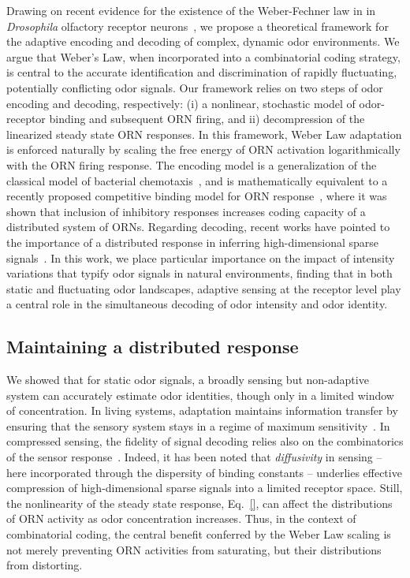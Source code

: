 Drawing on recent evidence for the existence of the Weber-Fechner law in in \textit{Drosophila} olfactory receptor neurons~\cite{cafaro_WL, cao_WL,  srinivas_elife}, we propose a theoretical framework for the adaptive encoding and decoding of complex, dynamic odor environments. We argue that Weber's Law, when incorporated into a combinatorial coding strategy, is central to the accurate identification and discrimination of rapidly fluctuating, potentially conflicting odor signals. Our framework relies on two steps of odor encoding and decoding, respectively: (i) a nonlinear, stochastic model of odor-receptor binding and subsequent ORN firing, and ii) decompression of the linearized steady state ORN responses. In this framework, Weber Law adaptation is enforced naturally by scaling the free energy of ORN activation logarithmically with the ORN firing response. The encoding model is a generalization of the classical model of bacterial chemotaxis~\cite{tu_shimizu_berg}, and is mathematically equivalent to a recently proposed competitive binding model for ORN response~\cite{Cao_Tu_WL}, where it was shown that inclusion of inhibitory responses increases coding capacity of a distributed system of ORNs. Regarding decoding, recent works have pointed to the importance of a distributed response in inferring high-dimensional sparse signals~\cite{vijay_1, vijay_2, sharpee_zhang}. In this work, we place particular importance on the impact of intensity variations that typify odor signals in natural environments, finding that in both static and fluctuating odor landscapes, adaptive sensing at the receptor level play a central role in the simultaneous decoding of odor intensity and odor identity. 


\subsection*{Maintaining a distributed response}

We showed that for static odor signals, a broadly sensing but non-adaptive system can accurately estimate odor identities, though only in a limited window of concentration. In living systems, adaptation maintains information transfer by ensuring that the sensory system stays in a regime of maximum sensitivity~\cite{information_theory_adaptation}. In compressed sensing, the fidelity of signal decoding relies also on the combinatorics of the sensor response~\cite{CS_tao, CS_donoho, CS_ganguli}. Indeed, it has been noted that \textit{diffusivity} in sensing -- here incorporated through the dispersity of binding constants -- underlies effective compression of high-dimensional sparse signals into a limited receptor space. Still, the nonlinearity of the steady state response, Eq.~\ref{}, can affect the distributions of ORN activity as odor concentration increases. Thus, in the context of combinatorial coding, the central benefit conferred by the Weber Law scaling is not merely preventing ORN activities from saturating, but their distributions from distorting. 

